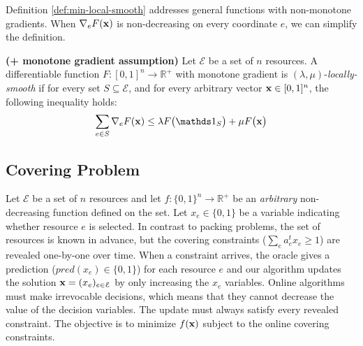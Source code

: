 Definition \ref{def:min-local-smooth} addresses general functions with non-monotone gradients. When $\nabla_{e} F(\mathbf{x})$ is non-decreasing on every coordinate $e$, we can simplify the definition.

\begin{definition} \textbf{(+ monotone gradient assumption)} \label{def:min-local-smooth-increasing}
    Let $\mathcal{E}$ be a set of $n$ resources.
    A differentiable function $F: [0,1]^{n} \rightarrow \mathbb{R}^{+}$ with monotone gradient is $(\lambda,\mu)$-\emph{locally-smooth} if for every set $S \subseteq \mathcal{E}$, and for every arbitrary vector $\mathbf{x} \in [0,1]^{n}$, the following inequality holds:
    \begin{equation*} \label{eq:min-local-smooth-increasing}
        \sum_{e \in S} \nabla_{e} F(\vect{x}) \leq \lambda F\bigl( \one_{S} \bigr) + \mu F\bigl( \vect{x} \bigr)
    \end{equation*}
\end{definition}


\subsection{Covering Problem}
Let $\mathcal{E}$ be a set of $n$ resources
and let $f: \{0,1\}^{n} \rightarrow \mathbb{R}^{+}$ be an  \emph{arbitrary} non-decreasing function defined on the set.
Let $x_{e} \in \{0,1\}$ be a variable indicating whether resource $e$ is selected.
In contrast to packing problems, the set of resources is known in advance, but the covering constraints ($\sum_{e} a_{e}^{t} x_{e} \geq 1$) are revealed one-by-one over time. When a constraint arrives, the oracle gives a prediction ($pred(x_{e}) \in \{0,1\}$) for each resource $e$ and our algorithm updates the solution $\mathbf{x} = (x_{e})_{e \in \mathcal{E}}$ by only increasing the $x_e$ variables. Online algorithms must make irrevocable decisions, which means that they cannot decrease the value of the decision variables. The update must always satisfy every revealed constraint.
The objective is to minimize $f(\mathbf{x})$ subject to the online covering constraints.